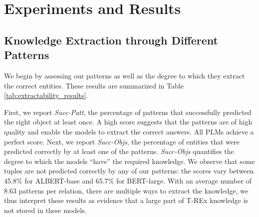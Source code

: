 \section{Experiments and Results}
\label{sec:experiments}


% 



\subsection{Knowledge Extraction through Different Patterns}




We begin by assessing our patterns as
well as the degree to which they extract the correct
entities. These results are summarized in Table
\ref{tab:extractability_results}.

First, we report \emph{Succ-Patt}, the percentage of
patterns that successfully predicted the right object at
least once. A high score suggests that the patterns are of high quality and enable the models to extract the correct answers. All PLMs achieve a perfect score.
Next, we report
\emph{Succ-Objs},
the percentage of entities that were predicted correctly by at least one of the patterns.
\textit{Succ-Objs} quantifies the degree to which the models
``have'' the required knowledge.
We observe that some tuples are not predicted correctly by any of our patterns: the scores vary between 45.8\% for ALBERT-base and 65.7\% for BERT-large. %
With an average number of 8.63 patterns per relation, there are multiple ways to extract the knowledge, we thus interpret these results as evidence that a large part of T-REx knowledge is not stored in these models.


